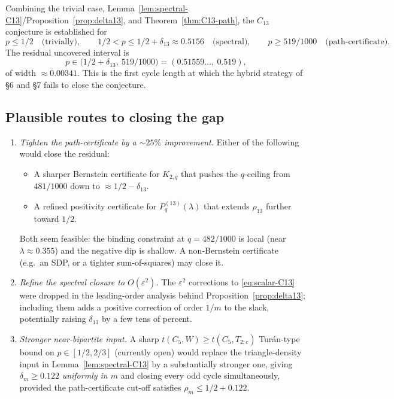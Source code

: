 \documentclass[11pt]{article}
\newcommand{\eps}{\varepsilon}
\begin{document}
Combining the trivial case, Lemma~\ref{lem:spectral-C13}/Proposition~\ref{prop:delta13}, and Theorem~\ref{thm:C13-path}, the $C_{13}$ conjecture is established for
\[
        p \le 1/2 \quad \text{(trivially)}, \qquad 1/2 < p \le 1/2 + \delta_{13} \approx 0.5156 \quad \text{(spectral)}, \qquad p \ge 519/1000 \quad \text{(path-certificate)}.
\]
The residual uncovered interval is
\[
        p \in \bigl(1/2 + \delta_{13},\ 519/1000\bigr) = (0.51559\ldots,\ 0.519),
\]
of width $\approx 0.00341$.  This is the first cycle length at which the hybrid strategy of \S 6 and \S 7 fails to close the conjecture.

\subsection{Plausible routes to closing the gap}

\begin{enumerate}[leftmargin=2em]
\item \emph{Tighten the path-certificate by a $\sim 25\%$ improvement.}  Either of the following would close the residual:
\begin{itemize}
\item A sharper Bernstein certificate for $K_{2, q}$ that pushes the $q$-ceiling from $481/1000$ down to $\approx 1/2 - \delta_{13}$.
\item A refined positivity certificate for $P_q^{(13)}(\lambda)$ that extends $\rho_{13}$ further toward $1/2$.
\end{itemize}
Both seem feasible: the binding constraint at $q = 482/1000$ is local (near $\lambda \approx 0.355$) and the negative dip is shallow.  A non-Bernstein certificate (e.g.\ an SDP, or a tighter sum-of-squares) may close it.

\item \emph{Refine the spectral closure to $O(\eps^2)$.}  The $\eps^2$ corrections to \eqref{eq:scalar-C13} were dropped in the leading-order analysis behind Proposition~\ref{prop:delta13}; including them adds a positive correction of order $1/m$ to the slack, potentially raising $\delta_{13}$ by a few tens of percent.

\item \emph{Stronger near-bipartite input.}  A sharp $t(C_5, W) \ge t(C_5, T_{2;c})$ Tur\'an-type bound on $p \in [1/2, 2/3]$ (currently open) would replace the triangle-density input in Lemma~\ref{lem:spectral-C13} by a substantially stronger one, giving $\delta_m \ge 0.122$ \emph{uniformly in $m$} and closing every odd cycle simultaneously, provided the path-certificate cut-off satisfies $\rho_m \le 1/2 + 0.122$.
\end{enumerate}
\end{document}
